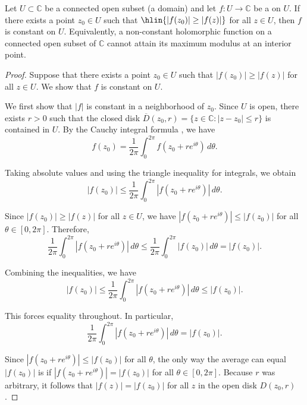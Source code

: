 \begin{theorem} \label{theorem:maximum_modulus_principle_if_a_holo_func_on_a_conn_open_subset_of_complex_plane_attains_maximum_modulus_at_an_interior_point_then_the_func_is_constant}
Let $U \subset \mathbb{C}$ be a connected open subset (a domain) and let $f : U \to \mathbb{C}$ be a  on $U$.
If there exists a point $z_0 \in U$ such that
$\hlin{|f(z_0)| \geq |f(z)|}$
for all $z \in U$, then $f$ is constant on $U$. Equivalently, a non-constant holomorphic function on a connected open subset of $\mathbb{C}$ cannot attain its maximum modulus at an interior point.
\end{theorem}

\begin{proof}
Suppose that there exists a point $z_0 \in U$ such that $|f(z_0)| \geq |f(z)|$ for all $z \in U$. We show that $f$ is constant on $U$.

We first show that $|f|$ is constant in a neighborhood of $z_0$. Since $U$ is open, there exists $r > 0$ such that the closed disk $\overline{D}(z_0, r) = \{ z \in \mathbb{C} : |z - z_0| \leq r \}$ is contained in $U$. By the Cauchy integral formula , we have
$$f(z_0) = \frac{1}{2\pi} \int_0^{2\pi} f(z_0 + re^{i\theta})\,d\theta.$$

Taking absolute values and using the triangle inequality for integrals, we obtain
$$|f(z_0)| \leq \frac{1}{2\pi} \int_0^{2\pi} |f(z_0 + re^{i\theta})|\,d\theta.$$

Since $|f(z_0)| \geq |f(z)|$ for all $z \in U$, we have $|f(z_0 + re^{i\theta})| \leq |f(z_0)|$ for all $\theta \in [0, 2\pi]$. Therefore,
$$\frac{1}{2\pi} \int_0^{2\pi} |f(z_0 + re^{i\theta})|\,d\theta \leq \frac{1}{2\pi} \int_0^{2\pi} |f(z_0)|\,d\theta = |f(z_0)|.$$

Combining the inequalities, we have
$$|f(z_0)| \leq \frac{1}{2\pi} \int_0^{2\pi} |f(z_0 + re^{i\theta})|\,d\theta \leq |f(z_0)|.$$

This forces equality throughout. In particular,
$$\frac{1}{2\pi} \int_0^{2\pi} |f(z_0 + re^{i\theta})|\,d\theta = |f(z_0)|.$$

Since $|f(z_0 + re^{i\theta})| \leq |f(z_0)|$ for all $\theta$, the only way the average can equal $|f(z_0)|$ is if $|f(z_0 + re^{i\theta})| = |f(z_0)|$ for all $\theta \in [0, 2\pi]$. Because $r$ was arbitrary, it follows that $|f(z)| = |f(z_0)|$ for all $z$ in the open disk $D(z_0, r)$.


\end{proof}
